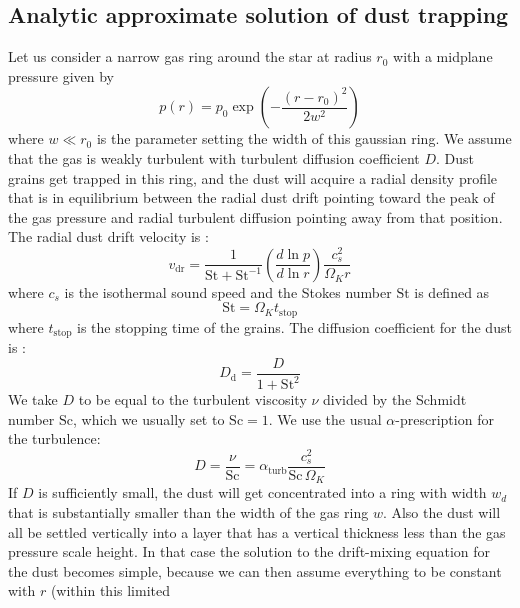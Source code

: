\documentclass{aa}
\begin{document}
\subsection{Analytic approximate solution of dust trapping}
\label{sec-analytic-model-of-trapping}
%
Let us consider a narrow gas ring around the star at radius $r_0$ with a
midplane pressure given by
\begin{equation}\label{eq-gaussian-pressure-bump}
p(r) = p_0 \exp\left(-\frac{(r-r_0)^2}{2w^2}\right)
\end{equation}
where $w\ll r_0$ is the parameter setting the width of this gaussian ring.
We assume that the gas is weakly turbulent with turbulent diffusion coefficient
$D$. Dust grains get trapped in this ring, and the dust will acquire a
radial density profile that is in equilibrium between the radial dust drift
pointing toward the peak of the gas pressure and radial turbulent diffusion
pointing away from that position. The radial dust drift velocity is
\citep[see e.g.][]{}:
\begin{equation}\label{eq-v-radial-drift}
  v_{\mathrm{dr}} = \frac{1}{\mathrm{St}+\mathrm{St}^{-1}}
  \left(\frac{d\ln p}{d\ln r}\right)\frac{c_s^2}{\Omega_Kr}
\end{equation}
where $c_s$ is the isothermal sound speed and the Stokes number $\mathrm{St}$ is
defined as
\begin{equation}
\mathrm{St} = \Omega_Kt_{\mathrm{stop}}
\end{equation}
where $t_{\mathrm{stop}}$ is the stopping time of the grains. The diffusion
coefficient for the dust is \citep{2007Icar..192..588Y}:
\begin{equation}
D_{\mathrm{d}} = \frac{D}{1+\mathrm{St}^2}
\end{equation}
We take $D$ to be equal to the turbulent viscosity $\nu$ divided by the
Schmidt number $\mathrm{Sc}$, which we usually set to $\mathrm{Sc}=1$.
We use the usual $\alpha$-prescription for the turbulence:
\begin{equation}
D=\frac{\nu}{\mathrm{Sc}}= \alpha_{\mathrm{turb}}\frac{c_s^2}{\mathrm{Sc}\,\Omega_K}
\end{equation}
If $D$ is sufficiently small, the dust will get concentrated into a ring with
width $w_d$ that is substantially smaller than the width of the gas ring
$w$. Also the dust will all be settled vertically into a layer that has a
vertical thickness less than the gas pressure scale height. In that case the
solution to the drift-mixing equation for the dust becomes simple, because
we can then assume everything to be constant with $r$ (within this limited
\end{document}
